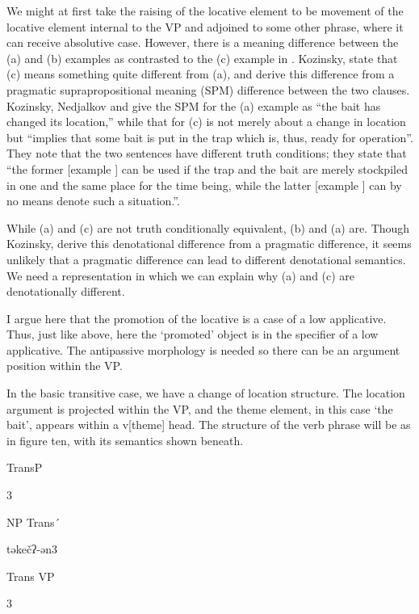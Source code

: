 \documentclass[output=paper,modfonts,nonflat]{langsci/langscibook}
\begin{document}
We might at first take the raising of the locative element to be movement of the locative element internal to the VP and adjoined to some other phrase, where it can receive absolutive case.  However, there is a meaning difference between the (a) and (b) examples as contrasted to the (c) example in .  Kozinsky, \citet{NedjalkovPolinskaja1988} state that (c) means something quite different from (a), and derive this difference from a pragmatic suprapropositional meaning (SPM) difference between the two clauses. Kozinsky, Nedjalkov and \citet[684]{Polinskaja1988} give the SPM for the (a) example as “the bait has changed its location,” while that for (c) is not merely about a change in location but “implies that some bait is put in the trap which is, thus, ready for operation”.  They note that the two sentences have different truth conditions; they state that “the former [example ] can be used if the trap and the bait are merely stockpiled in one and the same place for the time being, while the latter [example ] can by no means denote such a situation.”.  

While (a) and (c) are not truth conditionally equivalent, (b) and (a) are. Though Kozinsky, \citet{NedjalkovPolinskaja1988} derive this denotational difference from a pragmatic difference, it seems unlikely that a pragmatic difference can lead to different denotational semantics. We need a representation in which we can explain why (a) and (c) are denotationally different.

I argue here that the promotion of the locative is a case of a low applicative. Thus, just like above, here the ‘promoted’ object is in the specifier of a low applicative.  The antipassive morphology is needed so there can be an argument position within the VP.

In the basic transitive case, we have a change of location structure.  The location argument is projected within the VP, and the theme element, in this case ‘the bait’, appears within a v[theme] head. The structure of the verb phrase will be as in figure ten, with its semantics shown beneath. 

            TransP

                 3                  

              NP    Trans´ 

                   təkečʔ-ən3

                    Trans         VP

                        3
\end{document}
